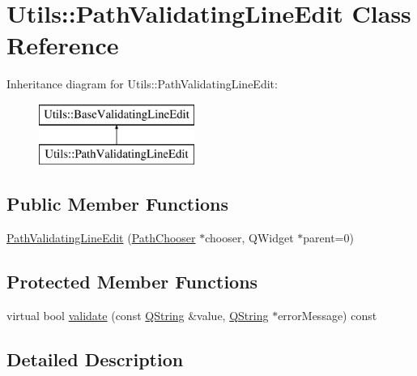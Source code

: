 \hypertarget{class_utils_1_1_path_validating_line_edit}{\section{\-Utils\-:\-:\-Path\-Validating\-Line\-Edit \-Class \-Reference}
\label{class_utils_1_1_path_validating_line_edit}
}
\-Inheritance diagram for \-Utils\-:\-:\-Path\-Validating\-Line\-Edit\-:\begin{figure}[H]
\begin{center}
\leavevmode
\includegraphics[height=2.000000cm]{class_utils_1_1_path_validating_line_edit}
\end{center}
\end{figure}
\subsection*{\-Public \-Member \-Functions}
\begin{DoxyCompactItemize}
\item 
\hyperlink{class_utils_1_1_path_validating_line_edit_af092de8965e280b10c969024b69fce7b}{\-Path\-Validating\-Line\-Edit} (\hyperlink{class_utils_1_1_path_chooser}{\-Path\-Chooser} $\ast$chooser, \-Q\-Widget $\ast$parent=0)
\end{DoxyCompactItemize}
\subsection*{\-Protected \-Member \-Functions}
\begin{DoxyCompactItemize}
\item 
virtual bool \hyperlink{class_utils_1_1_path_validating_line_edit_a11d7ce87a39a5709cc41bce1e602cb46}{validate} (const \hyperlink{group___u_a_v_objects_plugin_gab9d252f49c333c94a72f97ce3105a32d}{\-Q\-String} \&value, \hyperlink{group___u_a_v_objects_plugin_gab9d252f49c333c94a72f97ce3105a32d}{\-Q\-String} $\ast$error\-Message) const 
\end{DoxyCompactItemize}


\subsection{\-Detailed \-Description}


